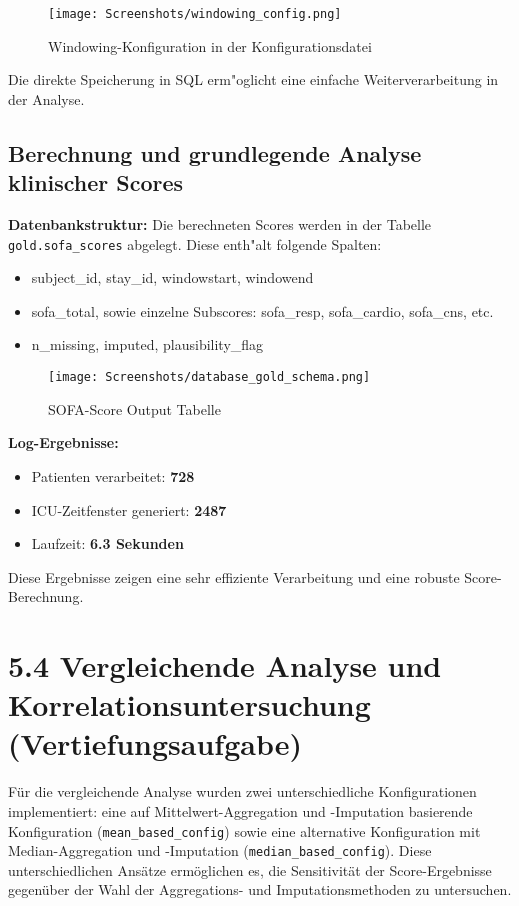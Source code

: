 \documentclass[12pt]{article}
\begin{document}
\begin{figure}[htbp]
\centering
\texttt{[image: Screenshots/windowing\_config.png]}
\caption{Windowing-Konfiguration in der Konfigurationsdatei}
\label{fig:hr_high}
\end{figure}

\noindent
Die direkte Speicherung in SQL erm"oglicht eine einfache Weiterverarbeitung in der Analyse.

\subsection{Berechnung und grundlegende Analyse klinischer Scores}

\textbf{Datenbankstruktur:} Die berechneten Scores werden in der Tabelle \texttt{gold.sofa\_scores} abgelegt. Diese enth"alt folgende Spalten:
\begin{itemize}
\item subject\_id, stay\_id, windowstart, windowend
\item sofa\_total, sowie einzelne Subscores: sofa\_resp, sofa\_cardio, sofa\_cns, etc.
\item n\_missing, imputed, plausibility\_flag
\end{itemize}

\begin{figure}[htbp]
\centering
\texttt{[image: Screenshots/database\_gold\_schema.png]}
\caption{SOFA-Score Output Tabelle}
\label{fig:hr_high}
\end{figure}

\newpage
\textbf{Log-Ergebnisse:}
\begin{itemize}
\item Patienten verarbeitet: \textbf{728}
\item ICU-Zeitfenster generiert: \textbf{2487}
\item Laufzeit: \textbf{6.3 Sekunden}
\end{itemize}

Diese Ergebnisse zeigen eine sehr effiziente Verarbeitung und eine robuste Score-Berechnung.

\section*{5.4 Vergleichende Analyse und Korrelationsuntersuchung (Vertiefungsaufgabe)}

\noindent Für die vergleichende Analyse wurden zwei unterschiedliche Konfigurationen implementiert: eine auf Mittelwert-Aggregation und -Imputation basierende Konfiguration (\texttt{mean\_based\_config}) sowie eine alternative Konfiguration mit Median-Aggregation und -Imputation (\texttt{median\_based\_config}). Diese unterschiedlichen Ansätze ermöglichen es, die Sensitivität der Score-Ergebnisse gegenüber der Wahl der Aggregations- und Imputationsmethoden zu untersuchen.
\end{document}
